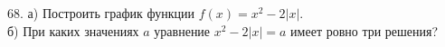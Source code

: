 68. а) Построить график функции $f(x)=x^2-2|x|.$\\
б) При каких значениях $a$ уравнение $x^2-2|x|=a$ имеет ровно три решения?\\
